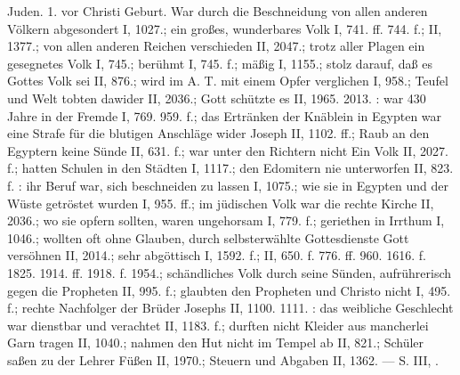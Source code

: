 Juden. 1.  vor Christi Geburt. War durch die Beschneidung von allen anderen Völkern abgesondert I, 1027.; ein großes, wunderbares Volk I, 741. ff. 744. f.; II, 1377.; von allen anderen Reichen verschieden II, 2047.; trotz aller Plagen ein gesegnetes Volk I, 745.; berühmt I, 745. f.; mäßig I, 1155.; stolz darauf, daß es Gottes Volk sei II, 876.; wird im A. T. mit einem Opfer verglichen I, 958.; Teufel und Welt tobten dawider II, 2036.; Gott schützte es II, 1965. 2013. : war 430 Jahre in der Fremde I, 769. 959. f.; das Ertränken der Knäblein in Egypten war eine Strafe für die blutigen Anschläge wider Joseph II, 1102. ff.; Raub an den Egyptern keine Sünde II, 631. f.; war unter den Richtern nicht Ein Volk II, 2027. f.; hatten Schulen in den Städten I, 1117.; den Edomitern nie unterworfen II, 823. f. : ihr Beruf war, sich beschneiden zu lassen I, 1075.; wie sie in Egypten und der Wüste getröstet wurden I, 955. ff.; im jüdischen Volk war die rechte Kirche II, 2036.; wo sie opfern sollten, waren ungehorsam I, 779. f.; geriethen in Irrthum I, 1046.; wollten oft ohne Glauben, durch selbsterwählte Gottesdienste Gott versöhnen II, 2014.; sehr abgöttisch I, 1592. f.; II, 650. f. 776. ff. 960. 1616. f. 1825. 1914. ff. 1918. f. 1954.; schändliches Volk durch seine Sünden, aufrührerisch gegen die Propheten II, 995. f.; glaubten den Propheten und Christo nicht I, 495. f.; rechte Nachfolger der Brüder Josephs II, 1100. 1111. : das weibliche Geschlecht war dienstbar und verachtet II, 1183. f.; durften nicht Kleider aus mancherlei Garn tragen II, 1040.; nahmen den Hut nicht im Tempel ab II, 821.; Schüler saßen zu der Lehrer Füßen II, 1970.; Steuern und Abgaben II, 1362. — S.  III, .

